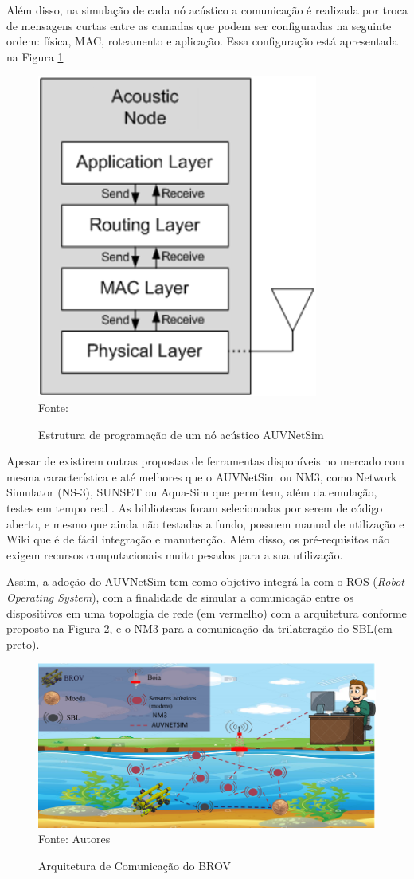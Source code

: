 Além disso, na simulação de cada nó acústico a comunicação é realizada por troca de mensagens curtas entre as camadas que podem ser configuradas na seguinte ordem: física, MAC, roteamento e aplicação. Essa configuração está apresentada na Figura \ref{fig:auvnetsim}

\begin{figure}[h]
	\centering
	\caption[Estrutura de programação de um nó acústico AUVNetSim]{Estrutura de programação de um nó acústico AUVNetSim}
	\label{fig:auvnetsim}
	\includegraphics[width=0.3\linewidth]{images/auvnetsim}\\
	\footnotesize Fonte: \cite{montana2008auvnetsim}
\end{figure}

Apesar de existirem outras propostas de ferramentas disponíveis no mercado com mesma característica e até melhores que o AUVNetSim ou NM3, como Network Simulator (NS-3), SUNSET ou Aqua-Sim que permitem, além da emulação, testes em tempo real \cite{godi2021survey}. As bibliotecas foram selecionadas por serem de código aberto, e mesmo que ainda não testadas a fundo, possuem manual de utilização \cite{montana2008auvnetsim} e Wiki \cite{SHERLOCK2019} que é de fácil integração e manutenção. Além disso, os pré-requisitos não exigem recursos computacionais muito pesados para a sua utilização.

Assim, a adoção do AUVNetSim tem como objetivo integrá-la com o ROS (\textit{Robot Operating System}), com a finalidade de simular a comunicação entre os dispositivos em uma topologia de rede (em vermelho) com a arquitetura conforme proposto na Figura \ref{fig:arquitetura-comunicacao-brov}, e o NM3 para a comunicação da trilateração do SBL(em preto).

\begin{figure}[h]
	\centering
	\caption[Arquitetura de Comunicação do BROV]{Arquitetura de Comunicação do BROV}
	\label{fig:arquitetura-comunicacao-brov}
	\includegraphics[width=1\linewidth]{images/arquitetura-comunicacao-brov}\\
	\footnotesize Fonte: Autores
\end{figure}

